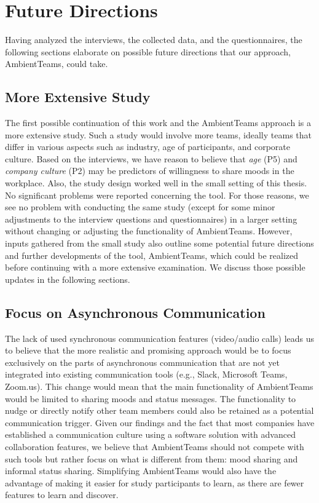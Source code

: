 \chapter{Future Directions}
Having analyzed the interviews, the collected data, and the questionnaires, the following sections elaborate on possible future directions that our approach, AmbientTeams, could take.

\label{chapter:future_directions}

\section{More Extensive Study}
The first possible continuation of this work and the AmbientTeams approach is a more extensive study. Such a study would involve more teams, ideally teams that differ in various aspects such as industry, age of participants, and corporate culture. Based on the interviews, we have reason to believe that \textit{age} (P5) and \textit{company culture} (P2) may be predictors of willingness to share moods in the workplace. Also, the study design worked well in the small setting of this thesis. No significant problems were reported concerning the tool. For those reasons, we see no problem with conducting the same study (except for some minor adjustments to the interview questions and questionnaires) in a larger setting without changing or adjusting the functionality of AmbientTeams. However, inputs gathered from the small study also outline some potential future directions and further developments of the tool, AmbientTeams, which could be realized before continuing with a more extensive examination. We discuss those possible updates in the following sections.


\section{Focus on Asynchronous Communication}
The lack of used synchronous communication features (video/audio calls) leads us to believe that the more realistic and promising approach would be to focus exclusively on the parts of asynchronous communication that are not yet integrated into existing communication tools (e.g., Slack, Microsoft Teams, Zoom.us). This change would mean that the main functionality of AmbientTeams would be limited to sharing moods and status messages. The functionality to nudge or directly notify other team members could also be retained as a potential communication trigger. Given our findings and the fact that most companies have established a communication culture using a software solution with advanced collaboration features, we believe that AmbientTeams should not compete with such tools but rather focus on what is different from them: mood sharing and informal status sharing. Simplifying AmbientTeams would also have the advantage of making it easier for study participants to learn, as there are fewer features to learn and discover.

